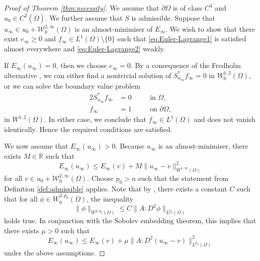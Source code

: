 \documentclass[a4paper]{article}
\newcommand{\R}{\mathbb{R}}
\newcommand{\W}{\mathcal{W}}
\theoremstyle{remark}
\begin{document}
\begin{proof}[Proof of Theorem \ref{thm:necessity}]
We assume that $\partial \Omega$ is of class $C^3$ and $u_0 \in C^2(\overline{\Omega})$. We further assume that $S$ is admissible.
Suppose that $u_\infty \in u_0 + \W_0^{2, \infty}(\Omega)$ is an almost-minimiser
of $E_\infty$. We wish to show that there exist $e_\infty \ge 0$ and
$f_\infty \in L^1(\Omega) \setminus \{0\}$ such that \eqref{eq:Euler-Lagrange1}
is satisfied almost everywhere and \eqref{eq:Euler-Lagrange2} weakly.

If $E_\infty(u_\infty) = 0$, then we choose
$e_\infty = 0$. By a consequence of the Fredholm alternative \cite[Theorem 6.2.4]{Evans:98}, we can either find a nontrivial
solution of $S_{u_\infty}^* f_\infty = 0$ in $W_0^{1, 2}(\Omega)$, or we can solve the boundary value problem
\begin{alignat*}{2}
S_{u_\infty}^* f_\infty & = 0 & \quad & \text{in $\Omega$}, \\
f_\infty & = 1 && \text{on $\partial \Omega$},
\end{alignat*}
in $W^{1, 2}(\Omega)$.
In either case, we conclude that $f_\infty \in L^1(\Omega)$ and does not vanish identically. Hence the required conditions are satisfied.

We now assume that
$E_\infty(u_\infty) > 0$. Because $u_\infty$ is an almost-minimiser,
there exists $M \in \R$ such that
\[
E_\infty(u_\infty) \le E_\infty(v) + M \|u_\infty - v\|_{W^{1, \infty}(\Omega)}^2
\]
for all $v \in u_0 + \W_0^{2, \infty}(\Omega)$. Choose $p_0 > n$ such
that the statement from Definition \ref{def:admissible} applies.
Note that by \cite[Lemma 9.17]{Gilbarg-Trudinger:83}, there exists
a constant $C$ such that for all $\phi \in W_0^{2, p_0}(\Omega)$,
the inequality
\[
\|\phi\|_{W^{2, p_0}(\Omega)} \le C\|A : D^2\phi\|_{L^{p_0}(\Omega)}
\]
holds true. In conjunction with the Sobolev embedding theorem, this implies
that there exists $\mu > 0$ such that
\[
E_\infty(u_\infty) \le E_\infty(v) + \mu \|A : D^2(u_\infty - v)\|_{L^{p_0}(\Omega)}^2
\]
under the above assumptions.


\end{proof}
\end{document}

